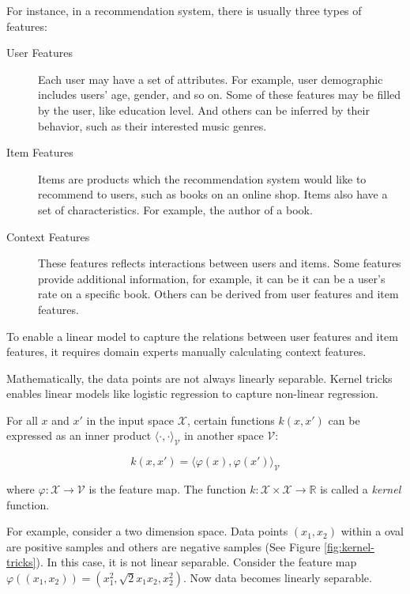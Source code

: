         For instance, in a recommendation system, there is usually three types of features: \cite{Ricci2011}

        \begin{description}
            \item[User Features] Each user may have a set of attributes.
                For example, user demographic includes users' age, gender, and so on.
                Some of these features may be filled by the user, like education level.
                And others can be inferred by their behavior, such as their interested music genres.
            \item[Item Features] Items are products which the recommendation system would like to recommend to users,
                such as books on an online shop.
                Items also have a set of characteristics.
                For example, the author of a book.
            \item[Context Features] These features reflects interactions between users and items.
                Some features provide additional information,
                for example, it can be it can be a user's rate on a specific book.
                Others can be derived from user features and item features.
        \end{description}

        To enable a linear model to capture the relations between user features and item features,
        it requires domain experts manually calculating context features.

        Mathematically, the data points are not always linearly separable.
        Kernel tricks enables linear models like logistic regression to capture non-linear regression.

        For all $x$ and $x'$ in the input space $\mathcal{X}$,
        certain functions $k(x, x')$ can be expressed as an inner product $\langle\cdot,\cdot\rangle_{\mathcal{V}}$
        in another space $\mathcal{V}$:

        \[
        k(x, x') = \langle \varphi(x), \varphi(x') \rangle_{\mathcal{V}}
        \]

        where $\varphi: \mathcal{X} \rightarrow \mathcal{V}$ is the feature map.
        The function $k: \mathcal{X} \times \mathcal{X} \rightarrow \mathbb{R}$ is called a \emph{kernel} function.

        For example, consider a two dimension space.
        Data points $(x_1, x_2)$ within a oval are positive samples and others are negative samples
        (See Figure \ref{fig:kernel-tricks}).
        In this case, it is not linear separable.
        Consider the feature map $\varphi((x_1, x_2)) = (x_1^2, \sqrt{2}x_1x_2, x_2^2)$.
        Now data becomes linearly separable. \cite{Rai2011}

